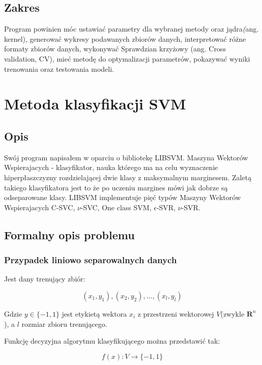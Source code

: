 \documentclass[paper=a4, fontsize=11pt]{scrartcl} %
\numberwithin{equation}{section} %
\numberwithin{figure}{section} %
\begin{document}
\subsection{Zakres}
    Program powinien móc ustawiać parametry dla wybranej metody oraz jądra\textit(ang. kernel),
    generować wykresy podawanych zbiorów danych, interpretować różne formaty zbiorów danych,
    wykonywać Sprawdzian krzyżowy (ang. Cross validation, CV), mieć metodę do optymalizacji
    parametrów, pokazywać wyniki trenowania oraz testowania modeli.
\newpage

\section{Metoda klasyfikacji SVM} %
\subsection{Opis}
    \par Swój program napisałem w oparciu o bibliotekę LIBSVM\cite{CC01a}. Maszyna Wektorów
    Wspierajacych - klasyfikator, nauka którego ma na celu wyznaczenie hiperpłaszczyzny
    rozdzielającej dwie klasy z maksymalnym marginesem.  Zaletą takiego klasyfikatora jest to
    że po uczeniu margines mówi jak dobrze są odseparowane klasy. LIBSVM implementuje pięć
    typów Maszyny Wektorów Wspierajacych C-SVC, $\nu$-SVC, One class SVM, $\epsilon$-SVR,
    $\nu$-SVR.
\subsection{Formalny opis problemu}
\subsubsection{Przypadek liniowo separowalnych danych}
    \par Jest dany trenujący zbiór:

    \begin{equation}
        (x_1,y_1),(x_2,y_2),...,(x_l,y_l)
    \end{equation}

    \par Gdzie $y\in\{-1,1\}$ jest etykietą wektora $x_i$ z przestrzeni wektorowej $V$(zwykle
    $\pmb{R}^n$), a $l$ rozmiar zbioru trenującego.
    \par Funkcję decyzyjna algorytmu
    klasyfikującego można przedstawić tak:

    \begin{equation}
        f(x): V \rightarrow \{-1,1\}
    \end{equation}
\end{document}
